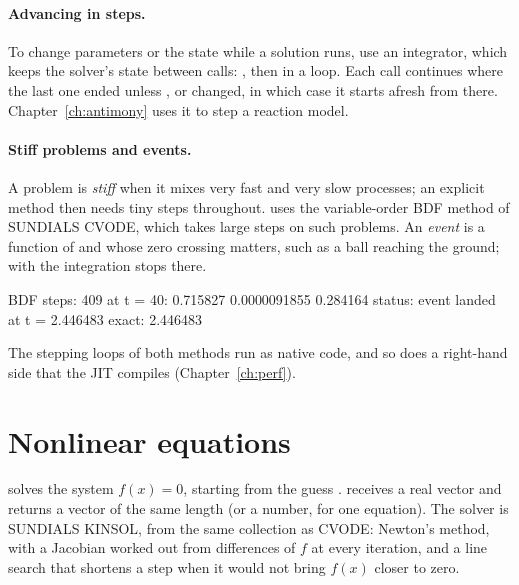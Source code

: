 \documentclass[11pt,a4paper,openany]{report}
\begin{document}
{{\paragraph{Advancing in steps.} To change parameters or the state while a
solution runs, use an integrator, which keeps the solver's state between
calls: , then
 in a loop. Each call
continues where the last one ended unless ,  or 
changed, in which case it starts afresh from there. Chapter~\ref{ch:antimony}
uses it to step a reaction model.

\paragraph{Stiff problems and events.} A problem is \emph{stiff} when it mixes
very fast and very slow processes; an explicit method then needs tiny steps
throughout.  uses the variable-order BDF method of SUNDIALS
CVODE, which takes large steps on such problems. An \emph{event} is a function
of  and  whose zero crossing matters, such as a ball reaching
the ground; with  the integration stops there.

\begin{axonout}
BDF steps: 409
at t = 40: 0.715827 0.0000091855 0.284164
status: event
landed at t = 2.446483  exact: 2.446483
\end{axonout}


The stepping loops of both methods run as native code, and so does a
right-hand side that the JIT compiles (Chapter~\ref{ch:perf}).

\section{Nonlinear equations}\label{sec:nonlin}

 solves the system $f(x) = 0$, starting from the
guess .  receives a real vector and returns a vector of
the same length (or a number, for one equation). The solver is SUNDIALS
KINSOL, from the same collection as CVODE: Newton's method, with a Jacobian
worked out from differences of $f$ at every iteration, and a line search that
shortens a step when it would not bring $f(x)$ closer to zero.

}}
\end{document}
